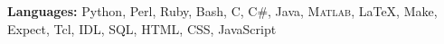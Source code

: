 
\textbf{Languages:} Python, Perl, Ruby, Bash, C, C\#, Java, \textsc{Matlab}, \LaTeX, Make, Expect, Tcl, IDL, SQL, HTML, CSS, JavaScript
